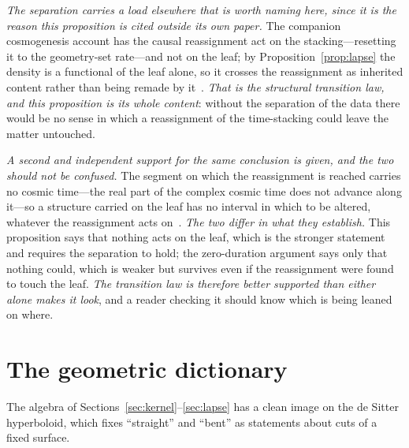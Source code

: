 \documentclass[11pt,a4paper]{article}
\theoremstyle{definition}
\begin{document}
\emph{The separation carries a load elsewhere that is worth naming here, since it is the reason this
proposition is cited outside its own paper.} The companion cosmogenesis account has the causal reassignment act
on the stacking---resetting it to the geometry-set rate---and not on the leaf; by
Proposition~\ref{prop:lapse} the density is a functional of the leaf alone, so it crosses the reassignment as
inherited content rather than being remade by it~\cite{JanzenCosmogenesis, JanzenCRcosmology}. \emph{That is the
structural transition law, and this proposition is its whole content}: without the separation of the data there
would be no sense in which a reassignment of the time-stacking could leave the matter untouched.

\emph{A second and independent support for the same conclusion is given, and the two should not be
confused.} The segment on which the reassignment is reached carries no cosmic time---the real part of the
complex cosmic time does not advance along it---so a structure carried on the leaf has no interval in which to
be altered, whatever the reassignment acts on~\cite{JanzenCanonicalTime}. \emph{The two differ in what they
establish.} This proposition says that nothing acts on the leaf, which is the stronger statement and requires
the separation to hold; the zero-duration argument says only that nothing could, which is weaker but survives
even if the reassignment were found to touch the leaf. \emph{The transition law is therefore better supported
than either alone makes it look}, and a reader checking it should know which is being leaned on where.

\section{The geometric dictionary}\label{sec:dictionary}

The algebra of Sections~\ref{sec:kernel}--\ref{sec:lapse} has a clean image on the de Sitter hyperboloid, which fixes ``straight'' and ``bent'' as statements about cuts of a fixed surface.
\end{document}

